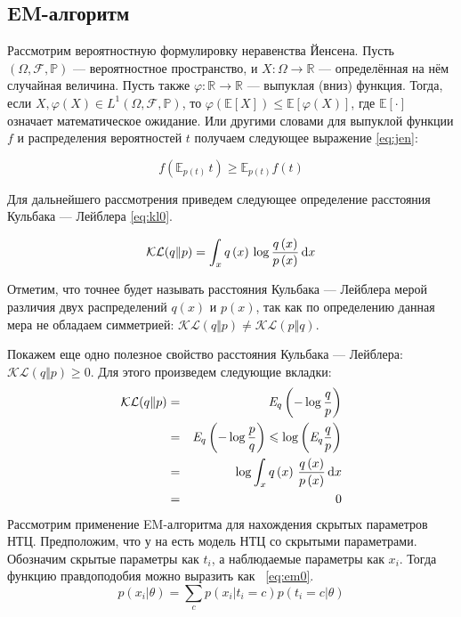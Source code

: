 \subsection{EM-алгоритм}
Рассмотрим вероятностную формулировку неравенства Йенсена. 
Пусть $(\Omega,\mathcal{F},\mathbb{P})$ — вероятностное пространство, и $X\colon\Omega \to \mathbb{R}$ — определённая на нём случайная величина. 
Пусть также $\varphi\colon\mathbb{R} \to \mathbb{R}$ — выпуклая (вниз) функция. 
Тогда, если $X, \varphi(X) \in L^1(\Omega,\mathcal{F},\mathbb{P})$, то  $\varphi(\mathbb{E}[X]) \leqslant \mathbb{E}[\varphi(X)]$, где $\mathbb{E}[\cdot]$ означает математическое ожидание. 
Или другими словами для выпуклой функции $f$ и распределения вероятностей $t$ получаем следующее выражение \ref{eq:jen}: 

\begin{equation} \label{eq:jen}
f (\mathbb{E}_{p \left( t \right)} \, t) \geqslant \mathbb{E}_{p \left( t \right)}f(t)
\end{equation}

Для дальнейшего рассмотрения приведем следующее определение расстояния Кульбака — Лейблера \ref{eq:kl0}. 

\begin{equation} \label{eq:kl0}
\mathcal{KL}(q \Vert  p) = \int_x q \left( x \right) \, \log \frac{q \left( x \right)}{p \left(  x \right)} \, {\textrm d}x
\end{equation}

Отметим, что точнее будет называть расстояния Кульбака — Лейблера мерой различия двух распределений $q \left( x \right)$ и $p \left(  x \right)$, так как по определению данная мера не обладаем симметрией: $\mathcal{KL}(q \Vert p) \neq \mathcal{KL}(p \Vert q)$. 

Покажем еще одно полезное свойство расстояния Кульбака — Лейблера: $\mathcal{KL}(q \Vert p) \geqslant 0$.
Для этого произведем следующие вкладки:
\begin{eqnarray}\label{eq:kl03}
\mathcal{KL}(q \Vert   p) 
& = & \mathit{E}_q \left(  - \log	 \frac{q}{p} \right) \\
& = & \mathit{E}_q \left(  - \log	 \frac{p}{q} \right) \leqslant  \log \left( \mathit{E}_q \frac{q}{p} \right)\\
& = & \log \int_x q \left( x \right) \, \frac{q \left( x \right)}{p \left(  x \right)} \, {\textrm d}x \\
& = & 0
\end{eqnarray}
Рассмотрим применение EM-алгоритма для нахождения скрытых параметров НТЦ.
Предположим, что у на есть модель НТЦ со скрытыми параметрами. 
Обозначим скрытые параметры как $t_i$, а наблюдаемые параметры как $x_i$. 
Тогда функцию правдоподобия можно выразить как ~\ref{eq:em0}.
\begin{equation} \label{eq:em0}
p \left( x_i \vert	\theta \right) = \sum_c p \left( x_i \vert t_i = c \right) p \left( t_i = c \vert \theta \right) 
\end{equation}

